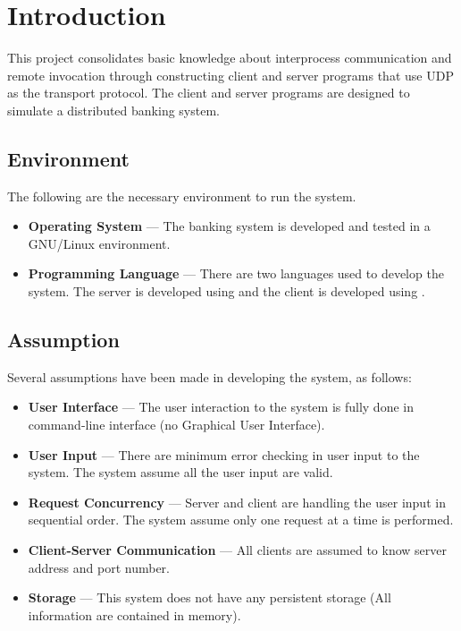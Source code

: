 \documentclass[12pt]{article}
\begin{document}
\tableofcontents
\pagebreak


\section{Introduction}
This project consolidates basic knowledge about interprocess communication and remote invocation through constructing client and server programs that use UDP as the transport protocol. The client and server programs are designed to simulate a distributed banking system.

\subsection{Environment}
The following are the necessary environment to run the system.

\begin{itemize}
	\item \textbf{Operating System} --- The banking system is developed and tested in a GNU/Linux environment. 
    \item \textbf{Programming Language} --- There are two languages used to develop the system. The server is developed using  and the client is developed using .
\end{itemize}

\subsection{Assumption}
Several assumptions have been made in developing the system, as follows:

\begin{itemize}
	\item \textbf{User Interface} --- The user interaction to the system is fully done in command-line interface (no Graphical User Interface).
	\item \textbf{User Input} --- There are minimum error checking in user input to the system. The system assume all the user input are valid.
    \item \textbf{Request Concurrency} --- Server and client are handling the user input in sequential order. The system assume only one request at a time is performed.
    \item \textbf{Client-Server Communication} --- All clients are assumed to know server address and port number.
    \item \textbf{Storage} --- This system does not have any persistent storage (All information are contained in memory).
\end{itemize}
\end{document}
